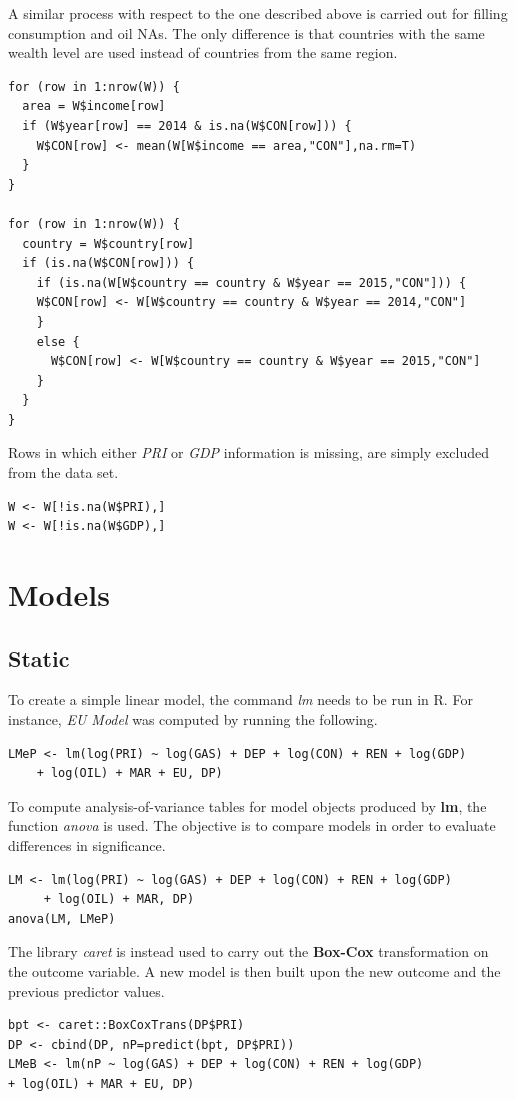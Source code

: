 \documentclass[a4paper,12pt]{book}
\begin{document}
\begin{appendices}
A similar process with respect to the one described above is carried out for filling consumption and oil NAs. The only difference is that countries with the same wealth level are used instead of countries from the same region.

\begin{verbatim}
for (row in 1:nrow(W)) {
  area = W$income[row]
  if (W$year[row] == 2014 & is.na(W$CON[row])) {
    W$CON[row] <- mean(W[W$income == area,"CON"],na.rm=T)
  }
}

for (row in 1:nrow(W)) {
  country = W$country[row]
  if (is.na(W$CON[row])) {
    if (is.na(W[W$country == country & W$year == 2015,"CON"])) {
    W$CON[row] <- W[W$country == country & W$year == 2014,"CON"]
    }
    else {
      W$CON[row] <- W[W$country == country & W$year == 2015,"CON"]
    }
  }
}
\end{verbatim}

Rows in which either \textit{PRI} or \textit{GDP} information is missing, are simply excluded from the data set.

\begin{verbatim}
W <- W[!is.na(W$PRI),]
W <- W[!is.na(W$GDP),]
\end{verbatim}

\chapter*{Models}
\section*{Static}

To create a simple linear model, the command \textit{lm} needs to be run in R. For instance, \textit{EU Model} was computed by running the following.

\begin{verbatim}
LMeP <- lm(log(PRI) ~ log(GAS) + DEP + log(CON) + REN + log(GDP)
    + log(OIL) + MAR + EU, DP)
\end{verbatim}

To compute analysis-of-variance tables for model objects produced by \textbf{lm}, the function \textit{anova} is used. The objective is to compare models in order to evaluate differences in significance.

\begin{verbatim}
LM <- lm(log(PRI) ~ log(GAS) + DEP + log(CON) + REN + log(GDP)
     + log(OIL) + MAR, DP)
anova(LM, LMeP)
\end{verbatim}

The library \textit{caret} is instead used to carry out the \textbf{Box-Cox} transformation on the outcome variable. A new model is then built upon the new outcome and the previous predictor values.

\begin{verbatim}
bpt <- caret::BoxCoxTrans(DP$PRI)
DP <- cbind(DP, nP=predict(bpt, DP$PRI))
LMeB <- lm(nP ~ log(GAS) + DEP + log(CON) + REN + log(GDP)
+ log(OIL) + MAR + EU, DP)
\end{verbatim}
\end{appendices}
\end{document}
